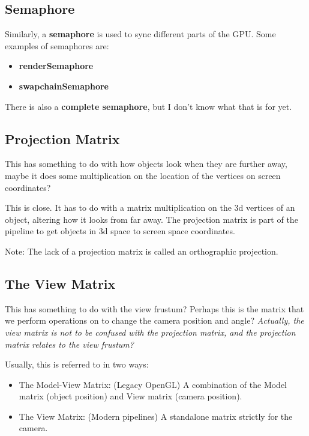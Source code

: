 \documentclass{article}
\begin{document}
\subsection*{Semaphore}
\par Similarly, a \textbf{semaphore} is used to sync different parts
of the GPU. Some examples of semaphores are:
\begin{itemize}
  \item \textbf{renderSemaphore}
  \item \textbf{swapchainSemaphore}
\end{itemize}
\par There is also a \textbf{complete semaphore}, but I don't know
what that is for yet.

\subsection*{Projection Matrix}
\par This has something to do with how objects look when they are
further away, maybe it does some multiplication on the location of
the vertices on screen coordinates?

\par This is close. It has to do with a matrix multiplication on the
3d vertices of an object, altering how it looks from far away. The
projection matrix is part of the pipeline to get objects in 3d space
to screen space coordinates.

\par Note: The lack of a projection matrix is called an orthographic projection.

\subsection*{The View Matrix}

\par This has something to do with the view frustum? Perhaps this is
the matrix that we perform operations on to change the camera
position and angle? \textit{Actually, the view matrix is not to be
  confused with the projection matrix, and the projection matrix
relates to the view frustum?}

\par Usually, this is referred to in two ways:
\begin{itemize}
  \item The Model-View Matrix: (Legacy OpenGL) A combination of the
    Model matrix (object position) and View matrix (camera position).
  \item The View Matrix: (Modern pipelines) A standalone matrix
    strictly for the camera.
\end{itemize}
\end{document}
